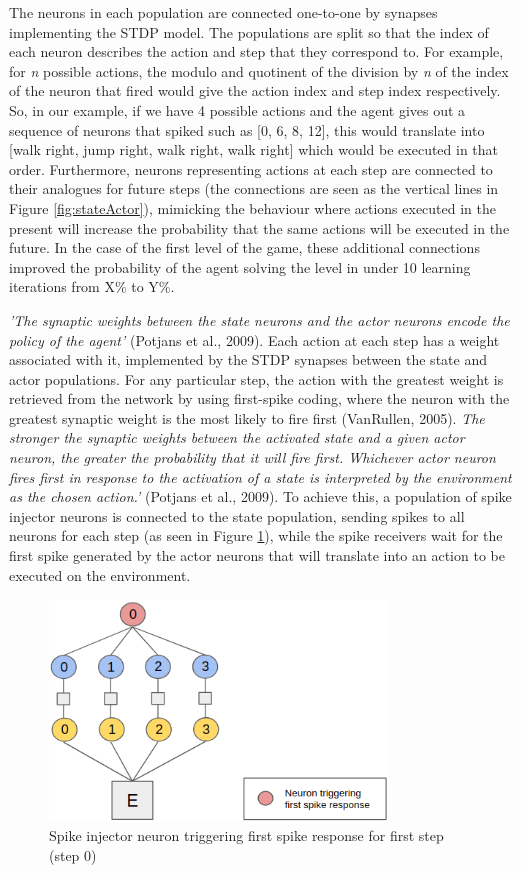 \documentclass[10pt]{article}
\begin{document}
    The neurons in each population are connected one-to-one by synapses implementing the STDP model. The populations are split so that the index of each neuron describes the action and step that they correspond to. For example, for \textit{n} possible actions, the modulo and quotinent of the division by \textit{n} of the index of the neuron that fired would give the action index and step index respectively. So, in our example, if we have 4 possible actions and the agent gives out a sequence of neurons that spiked such as [0, 6, 8, 12], this would translate into [walk right, jump right, walk right, walk right] which would be executed in that order. Furthermore, neurons representing actions at each step are connected to their analogues for future steps (the connections are seen as the vertical lines in Figure \ref{fig:stateActor}), mimicking the behaviour where actions executed in the present will increase the probability that the same actions will be executed in the future. In the case of the first level of the game, these additional connections improved the probability of the agent solving the level in under 10 learning iterations from X\% to Y\%.

    \textit{'The synaptic weights between the state neurons and the actor neurons encode the policy of the agent'} (Potjans et al., 2009). Each action at each step has a weight associated with it, implemented by the STDP synapses between the state and actor populations. For any particular step, the action with the greatest weight is retrieved from the network by using first-spike coding, where the neuron with the greatest synaptic weight is the most likely to fire first (VanRullen, 2005). \textit{The stronger the synaptic weights between the activated state and a given actor
    neuron, the greater the probability that it will fire first. Whichever actor
    neuron fires first in response to the activation of a state is interpreted by
    the environment as the chosen action.'} (Potjans et al., 2009). To achieve this, a population of spike injector neurons is connected to the state population, sending spikes to all neurons for each step (as seen in Figure \ref{fig:firstSpike}), while the spike receivers wait for the first spike generated by the actor neurons that will translate into an action to be executed on the environment.

    \begin{figure}[ht!]
    \centering
    \includegraphics[width=90mm]{./firstSpike.png}
    \caption{Spike injector neuron triggering first spike response for first step (step 0) \label{overflow}}
    \label{fig:firstSpike}
    \end{figure}
\end{document}
